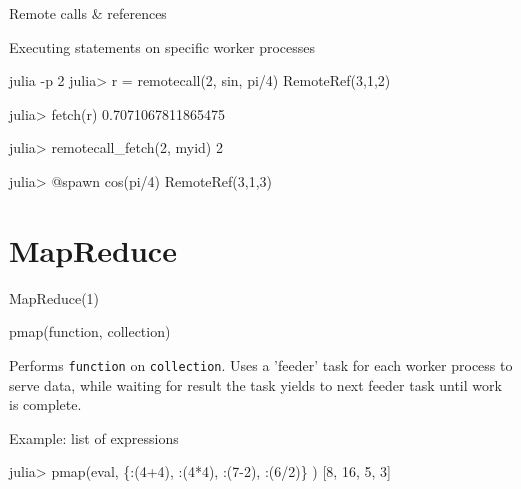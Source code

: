 \documentclass{beamer}
\begin{document}
	\begin{frame}[fragile]{Remote calls \& references}
		\begin{block}{Executing statements on specific worker processes}
		\begin{semiverbatim}
		julia -p 2
		julia> r = remotecall(2, sin, pi/4)
		RemoteRef(3,1,2) 

		julia> fetch(r)
		0.7071067811865475

		julia> remotecall\_fetch(2, myid)
		2
		
		julia> @spawn cos(pi/4) 
		RemoteRef(3,1,3)
		\end{semiverbatim}
		\end{block}
	\end{frame}

	\section{MapReduce}
	\begin{frame}[fragile]{MapReduce(1)}
		\begin{semiverbatim}
			pmap(function, collection)
		\end{semiverbatim}
		Performs \verb+function+ on \verb+collection+. Uses a 'feeder' task for each worker process to serve data, while waiting for result the task yields to next feeder task until work is complete. 
		\begin{block}{Example: list of expressions}
			\begin{semiverbatim}
				julia> pmap(eval, \{:(4+4), :(4*4), :(7-2), :(6/2)\} )
				[8, 16, 5, 3]
			\end{semiverbatim}
		\end{block}
	\end{frame}
\end{document}
